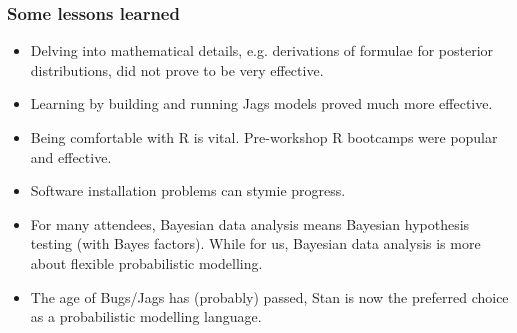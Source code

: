 \begin{frame}
	\frametitle{Some lessons learned}

	\begin{itemize}
		\item Delving into mathematical details, e.g. derivations of formulae for posterior distributions, did not prove to be very effective.
		\item Learning by building and running Jags models proved much more effective.
		\item Being comfortable with R is vital. Pre-workshop R bootcamps were popular and effective.
		\item Software installation problems can stymie progress.
		\item For many attendees, Bayesian data analysis means Bayesian hypothesis testing (with Bayes factors). While for us, Bayesian data analysis is more about flexible probabilistic modelling.
		\item The age of Bugs/Jags has (probably) passed, Stan is now the preferred choice as a probabilistic modelling language.

	\end{itemize}

\end{frame}
